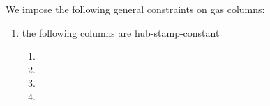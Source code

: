 We impose the following general constraints on gas columns:
\begin{enumerate}
        \item the following columns are hub-stamp-constant
		\begin{multicols}{3}
			\begin{enumerate}
				\item \gasExpected
				\item \gasNext
				\item \gasActual
				\item \gasCost
			\end{enumerate}
		\end{multicols}
\end{enumerate}
